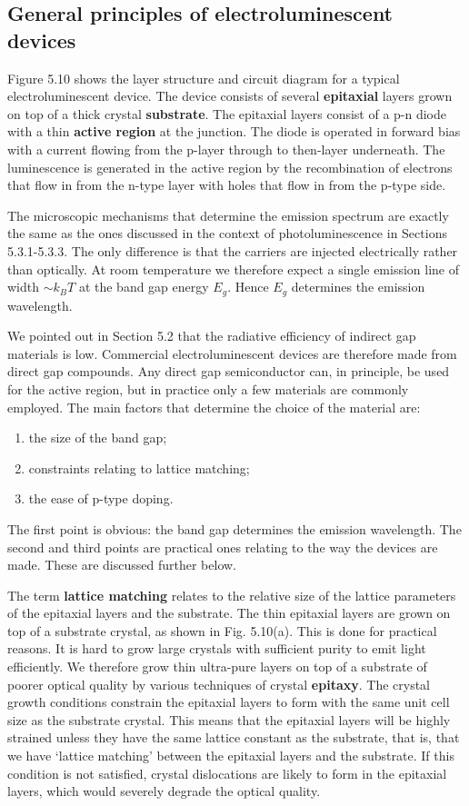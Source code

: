 \documentclass[12pt]{book}
\begin{document}
\subsection{General principles of electroluminescent devices}
Figure 5.10 shows the layer structure and circuit diagram for a typical electroluminescent device. The device consists of several \textbf{epitaxial} layers grown on top of a thick crystal \textbf{substrate}. The epitaxial layers consist of a p-n diode with a thin \textbf{active region} at the junction. The diode is operated in forward bias with a current flowing from the p-layer through to then-layer underneath. The luminescence is generated in the active region by the recombination of electrons that flow in from the n-type layer with holes that flow in from the p-type side.

The microscopic mechanisms that determine the emission spectrum are exactly the same as the ones discussed in the context of photoluminescence in Sections 5.3.1-5.3.3. The only difference is that the carriers are injected electrically rather than optically. At room temperature we therefore expect a single emission line of width $\sim k_BT$ at the band gap energy $E_g$. Hence $E_g$ determines the emission wavelength.

We pointed out in Section 5.2 that the radiative efficiency of indirect gap materials is low. Commercial electroluminescent devices are therefore made from direct gap compounds. Any direct gap semiconductor can, in principle, be used for the active region, but in practice only a few materials are commonly employed. The main factors that determine the choice of the material are:
\begin{enumerate}
  \item the size of the band gap;
  \item constraints relating to lattice matching;
  \item the ease of p-type doping.
\end{enumerate}
The first point is obvious: the band gap determines the emission wavelength. The second and third points are practical ones relating to the way the devices are made. These are discussed further below.

The term \textbf{lattice matching} relates to the relative size of the lattice parameters of the epitaxial layers and the substrate. The thin epitaxial layers are grown on top of a substrate crystal, as shown in Fig. 5.10(a). This is done for practical reasons. It is hard to grow large crystals with sufficient purity to emit light efficiently. We therefore grow thin ultra-pure layers on top of a substrate of poorer optical quality by various techniques of crystal \textbf{epitaxy}. The crystal growth conditions constrain the epitaxial layers to form with the same unit cell size as the substrate crystal. This means that the epitaxial layers will be highly strained unless they have the same lattice constant as the substrate, that is, that we have `lattice matching' between the epitaxial layers and the substrate. If this condition is not satisfied, crystal dislocations are likely to form in the epitaxial layers, which would severely degrade the optical quality.
\end{document}

